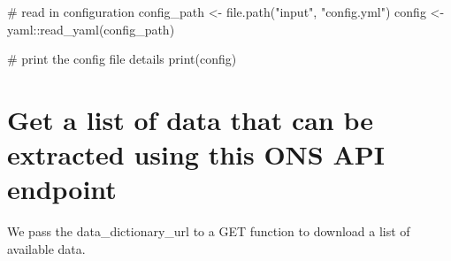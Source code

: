\documentclass[
  letterpaper,
]{book}
\newenvironment{Shaded}{\begin{snugshade}}{\end{snugshade}}
\newcommand{\CommentTok}[1]{\textcolor[rgb]{0.37,0.37,0.37}{#1}}
\newcommand{\FunctionTok}[1]{\textcolor[rgb]{0.28,0.35,0.67}{#1}}
\newcommand{\NormalTok}[1]{\textcolor[rgb]{0.00,0.23,0.31}{#1}}
\newcommand{\OtherTok}[1]{\textcolor[rgb]{0.00,0.23,0.31}{#1}}
\newcommand{\SpecialCharTok}[1]{\textcolor[rgb]{0.37,0.37,0.37}{#1}}
\newcommand{\StringTok}[1]{\textcolor[rgb]{0.13,0.47,0.30}{#1}}
\begin{document}
\begin{Shaded}
\begin{Highlighting}[]
\CommentTok{\# read in configuration}
\NormalTok{config\_path }\OtherTok{\textless{}{-}} \FunctionTok{file.path}\NormalTok{(}\StringTok{"input"}\NormalTok{, }\StringTok{"config.yml"}\NormalTok{)}
\NormalTok{config }\OtherTok{\textless{}{-}}\NormalTok{ yaml}\SpecialCharTok{::}\FunctionTok{read\_yaml}\NormalTok{(config\_path)}

\CommentTok{\# print the config file details}
\FunctionTok{print}\NormalTok{(config)}
\end{Highlighting}
\end{Shaded}

\hypertarget{get-a-list-of-data-that-can-be-extracted-using-this-ons-api-endpoint}{%
\section{Get a list of data that can be extracted using this ONS API
endpoint}\label{get-a-list-of-data-that-can-be-extracted-using-this-ons-api-endpoint}}

We pass the data\_dictionary\_url to a GET function to download a list
of available data.
\end{document}
